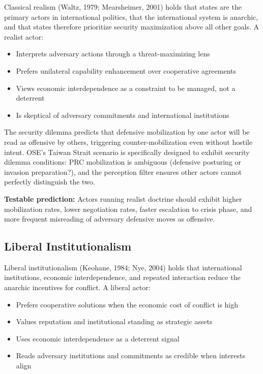\documentclass[12pt, a4paper]{article}
\begin{document}
Classical realism (Waltz, 1979; Mearsheimer, 2001) holds that states are the primary actors in international politics, that the international system is anarchic, and that states therefore prioritize security maximization above all other goals. A realist actor:
\begin{itemize}[leftmargin=1.5em]
    \item Interprets adversary actions through a threat-maximizing lens
    \item Prefers unilateral capability enhancement over cooperative agreements
    \item Views economic interdependence as a constraint to be managed, not a deterrent
    \item Is skeptical of adversary commitments and international institutions
\end{itemize}

The security dilemma predicts that defensive mobilization by one actor will be read as offensive by others, triggering counter-mobilization even without hostile intent. OSE's Taiwan Strait scenario is specifically designed to exhibit security dilemma conditions: PRC mobilization is ambiguous (defensive posturing or invasion preparation?), and the perception filter ensures other actors cannot perfectly distinguish the two.

\textbf{Testable prediction:} Actors running realist doctrine should exhibit higher mobilization rates, lower negotiation rates, faster escalation to crisis phase, and more frequent misreading of adversary defensive moves as offensive.

\subsection{Liberal Institutionalism}

Liberal institutionalism (Keohane, 1984; Nye, 2004) holds that international institutions, economic interdependence, and repeated interaction reduce the anarchic incentives for conflict. A liberal actor:
\begin{itemize}[leftmargin=1.5em]
    \item Prefers cooperative solutions when the economic cost of conflict is high
    \item Values reputation and institutional standing as strategic assets
    \item Uses economic interdependence as a deterrent signal
    \item Reads adversary institutions and commitments as credible when interests align
\end{itemize}
\end{document}
